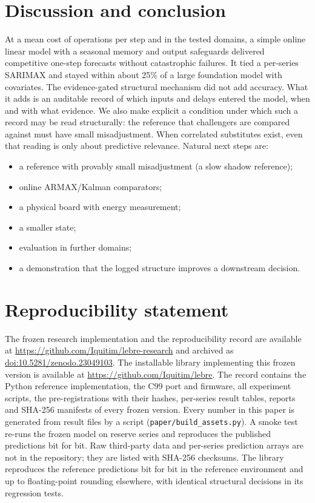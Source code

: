 \documentclass[11pt]{article}
\theoremstyle{remark}
\begin{document}
\section{Discussion and conclusion}
At a mean cost of \fpMean{} operations per step and in the tested domains, a simple online linear model with a seasonal memory and output safeguards delivered competitive one-step forecasts without catastrophic failures. It tied a per-series SARIMAX and stayed within about 25\% of a large foundation model with covariates. The evidence-gated structural mechanism did not add accuracy. What it adds is an auditable record of which inputs and delays entered the model, when and with what evidence. We also make explicit a condition under which such a record may be read structurally: the reference that challengers are compared against must have small misadjustment. When correlated substitutes exist, even that reading is only about predictive relevance. Natural next steps are:
\begin{itemize}
  \item a reference with provably small misadjustment (a slow shadow reference);
  \item online ARMAX/Kalman comparators;
  \item a physical board with energy measurement;
  \item a smaller state;
  \item evaluation in further domains;
  \item a demonstration that the logged structure improves a downstream decision.
\end{itemize}

\section*{Reproducibility statement}
The frozen research implementation and the reproducibility record are available at \url{https://github.com/Iquitim/lebre-research} and archived as \href{https://doi.org/10.5281/zenodo.23049103}{doi:10.5281/zenodo.23049103}. The installable library implementing this frozen version is available at \url{https://github.com/Iquitim/lebre}. The record contains the Python reference implementation, the C99 port and firmware, all experiment scripts, the pre-registrations with their hashes, per-series result tables, reports and SHA-256 manifests of every frozen version. Every number in this paper is generated from result files by a script (\texttt{paper/build\_assets.py}). A smoke test re-runs the frozen model on reserve series and reproduces the published predictions bit for bit. Raw third-party data and per-series prediction arrays are not in the repository; they are listed with SHA-256 checksums. The library reproduces the reference predictions bit for bit in the reference environment and up to floating-point rounding elsewhere, with identical structural decisions in its regression tests.
\end{document}
